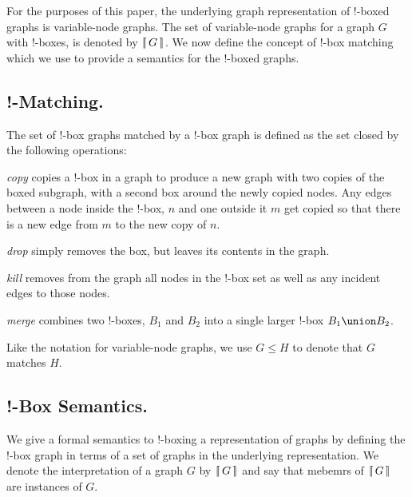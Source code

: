 \documentclass[runningheads]{llncs}
\newcommand{\binterp}[1]{\lceil\hspace{-0.27em}|\, #1\, |\hspace{-0.27em}\rceil}
\begin{document}
For the purposes of this paper, the underlying graph representation of
!-boxed graphs is variable-node graphs. The set of variable-node
graphs for a graph $G$ with !-boxes, is denoted by $\binterp{G}$. We
now define the concept of !-box matching which we use to provide a
semantics for the !-boxed graphs. 

\subsection{!-Matching.}

The set of !-box graphs matched by a !-box graph is defined as the set
closed by the following operations:

\begin{definition}
  \emph{copy} copies a !-box in a graph to produce a new graph with
  two copies of the boxed subgraph, with a second box around the newly
  copied nodes. Any edges between a node inside the !-box, $n$ and one
  outside it $m$ get copied so that there is a new edge from $m$ to
  the new copy of $n$.
\end{definition}

\begin{definition}
  \emph{drop} simply removes the box, but leaves its contents in the
  graph.
\end{definition}

\begin{definition}
  \emph{kill} removes from the graph all nodes in the !-box set as
  well as any incident edges to those nodes.
\end{definition}

\begin{definition}
  \emph{merge} combines two !-boxes, $B_1$ and $B_2$ into a single
  larger !-box $B_1 \union B_2$.
\end{definition}

Like the notation for variable-node graphs, we use $G \leq H$ to
denote that $G$ matches $H$. 

\subsection{!-Box Semantics.}

We give a formal semantics to !-boxing a representation of graphs by
defining the !-box graph in terms of a set of graphs in the
underlying representation. We denote the interpretation of a graph $G$
by $\binterp{G}$ and say that mebemrs of $\binterp{G}$ are instances
of $G$. 
\end{document}
